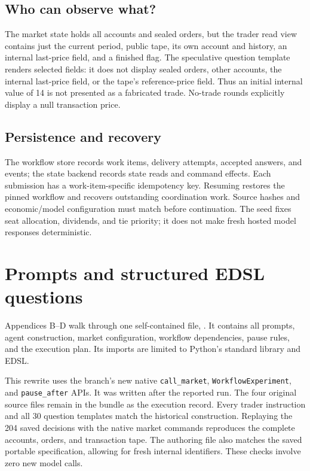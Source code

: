 \documentclass[11pt,letterpaper]{article}
\newcommand{\code}[1]{\texttt{\small #1}}
\begin{document}
\subsection*{Who can observe what?}
The market state holds all accounts and sealed orders, but the trader read view
contains just the current period, public tape, its own account and history,
an internal last-price field, and a finished flag. The speculative question
template renders selected fields: it does not display sealed orders, other
accounts, the internal last-price field, or the tape's reference-price field.
Thus an initial internal value of 14 is not presented as a fabricated trade.
No-trade rounds explicitly display a null transaction price.

\subsection*{Persistence and recovery}
The workflow store records work items, delivery attempts, accepted answers,
and events; the state backend records state reads and command effects.
Each submission has a work-item-specific idempotency key. Resuming
restores the pinned workflow and recovers outstanding coordination work.
Source hashes and economic/model configuration must match before continuation.
The seed fixes seat allocation, dividends, and tie priority; it does not make
fresh hosted model responses deterministic.

\clearpage
\section{Prompts and structured EDSL questions}\label{app:prompts}
Appendices B--D walk through one self-contained file,
. It contains all prompts, agent construction, market
configuration, workflow dependencies, pause rules, and the execution plan.
Its imports are limited to Python's standard library and EDSL.

This rewrite uses the branch's new native \code{call\_market},
\code{WorkflowExperiment}, and \code{pause\_after} APIs. It was written after
the reported run. The four original source files remain in the bundle as the
execution record. Every trader instruction and all 30 question templates match
the historical construction. Replaying the 204 saved decisions with the native
market commands reproduces the complete accounts, orders, and transaction tape.
The authoring file also matches the saved portable specification, allowing for
fresh internal identifiers. These checks involve zero new model calls.
\end{document}
